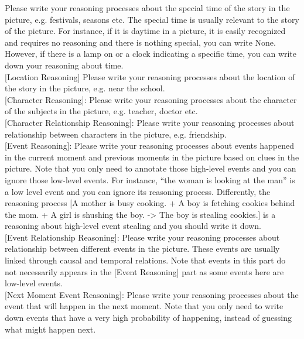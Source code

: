 \begin{figure*}
\begin{tcolorbox}
       Please write your reasoning processes about the special time of the story in the picture, e.g. festivals, seasons etc. The special time is usually relevant to the story of the picture. For instance, if it is daytime in a picture, it is easily recognized and requires no reasoning and there is nothing special, you can write None. However, if there is a lamp on or a clock indicating a specific time, you can write down your reasoning about time. \\
  
      [Location Reasoning] Please write your reasoning processes about the location of the story in the picture, e.g. near the school. \\
  
      [Character Reasoning]: Please write your reasoning processes about the character of the subjects in the picture, e.g. teacher, doctor etc. \\
  
      [Character Relationship Reasoning]: Please write your reasoning processes about relationship between characters in the picture, e.g. friendship.  \\
  
      [Event Reasoning]: Please write your reasoning processes about events happened in the current moment and previous moments in the picture based on clues in the picture. Note that you only need to annotate those high-level events and you can ignore those low-level events. For instance, “the woman is looking at the man” is a low level event and you can ignore its reasoning process. Differently, the reasoning process [A mother is busy cooking. + A boy is fetching cookies behind the mom. + A girl is shushing the boy. -> The boy is stealing cookies.] is a reasoning about high-level event stealing and you should write it down. \\
  
      [Event Relationship Reasoning]: Please write your reasoning processes about relationship between different events in the picture. These events are usually linked through causal and temporal relations. Note that events in this part do not necessarily appears in the [Event Reasoning] part as some events here are low-level events. \\
  
      [Next Moment Event Reasoning]: Please write your reasoning processes about the event that will happen in the next moment. Note that you only need to write down events that have a very high probability of happening, instead of guessing what might happen next. \\
  

\end{tcolorbox}
\end{figure*}
